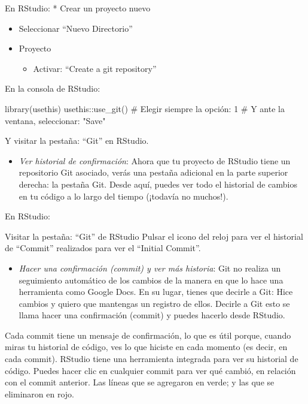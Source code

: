 \documentclass[
  letterpaper,
  DIV=11,
  numbers=noendperiod]{scrreprt}
\newenvironment{Shaded}{\begin{snugshade}}{\end{snugshade}}
\newcommand{\CommentTok}[1]{\textcolor[rgb]{0.37,0.37,0.37}{#1}}
\newcommand{\FunctionTok}[1]{\textcolor[rgb]{0.28,0.35,0.67}{#1}}
\newcommand{\NormalTok}[1]{\textcolor[rgb]{0.00,0.23,0.31}{#1}}
\newcommand{\SpecialCharTok}[1]{\textcolor[rgb]{0.37,0.37,0.37}{#1}}
\providecommand{\tightlist}{%
  \setlength{\itemsep}{0pt}\setlength{\parskip}{0pt}}\usepackage{longtable,booktabs,array}
\begin{document}
En RStudio: * Crear un proyecto nuevo

\begin{itemize}
\item
  Seleccionar ``Nuevo Directorio''
\item
  Proyecto

  \begin{itemize}
  \tightlist
  \item
    Activar: ``Create a git repository''
  \end{itemize}
\end{itemize}

En la consola de RStudio:

\begin{Shaded}
\begin{Highlighting}[]
\FunctionTok{library}\NormalTok{(usethis)}
\NormalTok{usethis}\SpecialCharTok{::}\FunctionTok{use\_git}\NormalTok{()}
\CommentTok{\# Elegir siempre la opción: 1}
\CommentTok{\# Y ante la ventana, seleccionar: "Save"}
\end{Highlighting}
\end{Shaded}

Y visitar la pestaña: ``Git'' en RStudio.

\begin{itemize}
\tightlist
\item
  {\emph{Ver historial de confirmación}}: Ahora que tu proyecto de
  RStudio tiene un repositorio Git asociado, verás una pestaña adicional
  en la parte superior derecha: la pestaña Git. Desde aquí, puedes ver
  todo el historial de cambios en tu código a lo largo del tiempo
  (¡todavía no muchos!).
\end{itemize}

En RStudio:

Visitar la pestaña: ``Git'' de RStudio Pulsar el icono del reloj para
ver el historial de ``Commit'' realizados para ver el ``Initial
Commit''.

\begin{itemize}
\tightlist
\item
  {\emph{Hacer una confirmación (commit) y ver más historia}}: Git no
  realiza un seguimiento automático de los cambios de la manera en que
  lo hace una herramienta como Google Docs. En su lugar, tienes que
  decirle a Git: Hice cambios y quiero que mantengas un registro de
  ellos. Decirle a Git esto se llama hacer una confirmación (commit) y
  puedes hacerlo desde RStudio.
\end{itemize}

Cada commit tiene un mensaje de confirmación, lo que es útil porque,
cuando miras tu historial de código, ves lo que hiciste en cada momento
(es decir, en cada commit). RStudio tiene una herramienta integrada para
ver su historial de código. Puedes hacer clic en cualquier commit para
ver qué cambió, en relación con el commit anterior. Las líneas que se
agregaron en verde; y las que se eliminaron en rojo.
\end{document}

